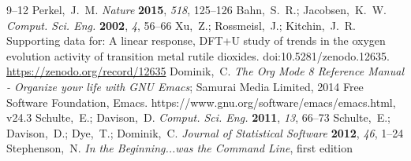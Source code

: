 \documentclass[journal=accacs,manuscript=article,email=true]{achemso}
\begin{document}
\begin{mcitethebibliography}{35}
  9--12\relax
\mciteBstWouldAddEndPuncttrue
\mciteSetBstMidEndSepPunct{\mcitedefaultmidpunct}
{\mcitedefaultendpunct}{\mcitedefaultseppunct}\relax
\EndOfBibitem
{}
Perkel,~J.~M. \emph{Nature} \textbf{2015}, \emph{518}, 125--126\relax
\mciteBstWouldAddEndPuncttrue
\mciteSetBstMidEndSepPunct{\mcitedefaultmidpunct}
{\mcitedefaultendpunct}{\mcitedefaultseppunct}\relax
\EndOfBibitem
{}
Bahn,~S.~R.; Jacobsen,~K.~W. \emph{Comput. Sci. Eng.} \textbf{2002}, \emph{4},
  56--66\relax
\mciteBstWouldAddEndPuncttrue
\mciteSetBstMidEndSepPunct{\mcitedefaultmidpunct}
{\mcitedefaultendpunct}{\mcitedefaultseppunct}\relax
\EndOfBibitem
{}
Xu,~Z.; Rossmeisl,~J.; Kitchin,~J.~R. Supporting data for: A linear response,
  {DFT+U} study of trends in the oxygen evolution activity of transition metal
  rutile dioxides. doi:10.5281/zenodo.12635.
  \url{https://zenodo.org/record/12635}\relax
\mciteBstWouldAddEndPuncttrue
\mciteSetBstMidEndSepPunct{\mcitedefaultmidpunct}
{\mcitedefaultendpunct}{\mcitedefaultseppunct}\relax
\EndOfBibitem
{}
Dominik,~C. \emph{The Org Mode 8 Reference Manual - Organize your life with GNU
  Emacs}; Samurai Media Limited, 2014\relax
\mciteBstWouldAddEndPuncttrue
\mciteSetBstMidEndSepPunct{\mcitedefaultmidpunct}
{\mcitedefaultendpunct}{\mcitedefaultseppunct}\relax
\EndOfBibitem
{}
{Free Software Foundation}, Emacs.
  https://www.gnu.org/software/emacs/emacs.html, v24.3\relax
\mciteBstWouldAddEndPuncttrue
\mciteSetBstMidEndSepPunct{\mcitedefaultmidpunct}
{\mcitedefaultendpunct}{\mcitedefaultseppunct}\relax
\EndOfBibitem
{}
Schulte,~E.; Davison,~D. \emph{Comput. Sci. Eng.} \textbf{2011}, \emph{13},
  66--73\relax
\mciteBstWouldAddEndPuncttrue
\mciteSetBstMidEndSepPunct{\mcitedefaultmidpunct}
{\mcitedefaultendpunct}{\mcitedefaultseppunct}\relax
\EndOfBibitem
{}
Schulte,~E.; Davison,~D.; Dye,~T.; Dominik,~C. \emph{Journal of Statistical
  Software} \textbf{2012}, \emph{46}, 1--24\relax
\mciteBstWouldAddEndPuncttrue
\mciteSetBstMidEndSepPunct{\mcitedefaultmidpunct}
{\mcitedefaultendpunct}{\mcitedefaultseppunct}\relax
\EndOfBibitem
{}
Stephenson,~N. \emph{In the Beginning...was the Command Line}, first edition

\end{mcitethebibliography}
\end{document}
